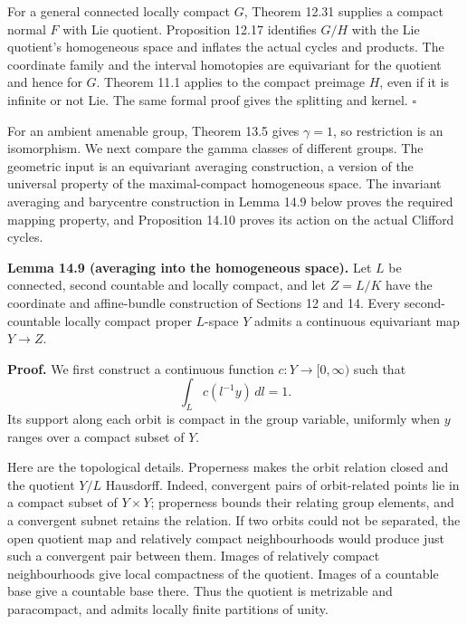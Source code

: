 \documentclass[
  11pt,
]{article}
\begin{document}
For a general connected locally compact \(G\), Theorem 12.31 supplies a
compact normal \(F\) with Lie quotient. Proposition 12.17 identifies
\(G/H\) with the Lie quotient's homogeneous space and inflates the
actual cycles and products. The coordinate family and the interval
homotopies are equivariant for the quotient and hence for \(G\). Theorem
11.1 applies to the compact preimage \(H\), even if it is infinite or
not Lie. The same formal proof gives the splitting and kernel.
\(\square\)

For an ambient amenable group, Theorem 13.5 gives \(\gamma=1\), so
restriction is an isomorphism. We next compare the gamma classes of
different groups. The geometric input is an equivariant averaging
construction, a version of the universal property of the maximal-compact
homogeneous space. The invariant averaging and barycentre construction
in Lemma 14.9 below proves the required mapping property, and
Proposition 14.10 proves its action on the actual Clifford cycles.

\textbf{Lemma 14.9 (averaging into the homogeneous space).} Let \(L\) be
connected, second countable and locally compact, and let \(Z=L/K\) have
the coordinate and affine-bundle construction of Sections 12 and 14.
Every second-countable locally compact proper \(L\)-space \(Y\) admits a
continuous equivariant map \(Y\to Z\).

\textbf{Proof.} We first construct a continuous function
\(c:Y\to[0,\infty)\) such that \[
\int_L c(l^{-1}y)\,dl=1.
\tag{14.43}
\] Its support along each orbit is compact in the group variable,
uniformly when \(y\) ranges over a compact subset of \(Y\).

Here are the topological details. Properness makes the orbit relation
closed and the quotient \(Y/L\) Hausdorff. Indeed, convergent pairs of
orbit-related points lie in a compact subset of \(Y\times Y\);
properness bounds their relating group elements, and a convergent subnet
retains the relation. If two orbits could not be separated, the open
quotient map and relatively compact neighbourhoods would produce just
such a convergent pair between them. Images of relatively compact
neighbourhoods give local compactness of the quotient. Images of a
countable base give a countable base there. Thus the quotient is
metrizable and paracompact, and admits locally finite partitions of
unity.
\end{document}
